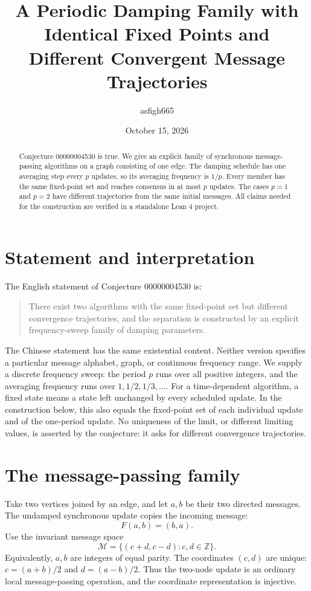\documentclass[11pt]{article}
\title{A Periodic Damping Family with Identical Fixed Points
and Different Convergent Message Trajectories}
\author{asfigh665}
\date{October 15, 2026}
\begin{document}
\maketitle

\begin{abstract}
Conjecture 00000004530 is true. We give an explicit family of synchronous
message-passing algorithms on a graph consisting of one edge. The damping
schedule has one averaging step every $p$ updates, so its averaging frequency
is $1/p$. Every member has the same fixed-point set and reaches consensus
in at most $p$ updates. The cases $p=1$ and $p=2$ have different trajectories
from the same initial messages. All claims needed for the construction are
verified in a standalone Lean 4 project.
\end{abstract}

\section{Statement and interpretation}
The English statement of Conjecture 00000004530 is:
\begin{quote}
There exist two algorithms with the same fixed-point set but different
convergence trajectories, and the separation is constructed by an explicit
frequency-sweep family of damping parameters.
\end{quote}
The Chinese statement has the same existential content. Neither version
specifies a particular message alphabet, graph, or continuous frequency
range. We supply a discrete frequency sweep: the period $p$ runs over all
positive integers, and the averaging frequency runs over $1,1/2,1/3,\ldots$.
For a time-dependent algorithm, a fixed state means a state left unchanged
by every scheduled update. In the construction below, this also equals the
fixed-point set of each individual update and of the one-period update.
No uniqueness of the limit, or different limiting values, is asserted by
the conjecture: it asks for different convergence trajectories.

\section{The message-passing family}
Take two vertices joined by an edge, and let $a,b$ be their two directed
messages. The undamped synchronous update copies the incoming message:
\[
  F(a,b)=(b,a).
\]
Use the invariant message space
\[
 \mathcal M=\{(c+d,c-d):c,d\in\mathbb Z\}.
\]
Equivalently, $a,b$ are integers of equal parity. The coordinates $(c,d)$
are unique: $c=(a+b)/2$ and $d=(a-b)/2$.
Thus the two-node update is an ordinary local message-passing operation,
and the coordinate representation is injective.
\end{document}

